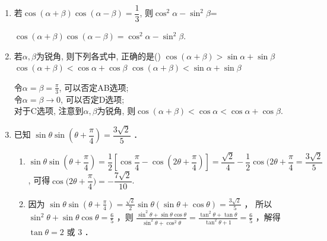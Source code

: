 \begin{enumerate}
\item 若$\cos(\alpha+\beta)\cos(\alpha-\beta)=\dfrac{1}{3}$, 则$\cos^2\alpha-\sin^2\beta$=
\begin{jieda}
$\cos(\alpha+\beta)\cos(\alpha-\beta)=\cos^2\alpha-\sin^2\beta$. 
\end{jieda}

\item 若$\alpha,\beta$为锐角, 则下列各式中, 正确的是\dotfill()
\xx{$\cos(\alpha+\beta)>\cos\alpha+\cos\beta$}
{$\cos(\alpha+\beta)>\sin\alpha+\sin\beta$}
{$\cos(\alpha+\beta)<\cos\alpha+\cos\beta$}
{$\cos(\alpha+\beta)<\sin\alpha+\sin\beta$}
\begin{jieda}
令$\alpha=\beta=\frac{\pi}{3}$, 可以否定AB选项; \\
令$\alpha=\beta\to0$, 可以否定D选项; \\
对于C选项, 注意到$\alpha,\beta$为锐角, 则$\cos(\alpha+\beta)<\cos\alpha<\cos\alpha+\cos\beta$. 
\end{jieda}


\item 已知 $\sin \theta \sin \left(\theta+\dfrac{\pi}{4}\right)=\dfrac{3 \sqrt{2}}{5}$ ．


\begin{jieda}
    \begin{enumerate}
        \item $\sin{\theta}\sin{(\theta+\dfrac{\pi}{4})}=\dfrac{1}{2}[\cos{\dfrac{\pi}{4}}-\cos{(2\theta+\dfrac{\pi}{4})}]=\dfrac{\sqrt{2}}{4}-\dfrac{1}{2}\cos{(2\theta+\dfrac{\pi}{4}}=\dfrac{3\sqrt{2}}{5}$, 可得$\cos{(2\theta+\dfrac{\pi}{4}})=-\dfrac{7\sqrt{2}}{10}$.
        \item 因为 $\sin \theta \sin \left(\theta+\frac{\pi}{4}\right)=\frac{\sqrt{2}}{2} \sin \theta(\sin \theta+\cos \theta)=\frac{3 \sqrt{2}}{5}$ ，
        所以 $\sin ^2 \theta+\sin \theta \cos \theta=\frac{6}{5}$ ，则 $\frac{\sin ^2 \theta+\sin \theta \cos \theta}{\sin ^2 \theta+\cos ^2 \theta}=\frac{\tan ^2 \theta+\tan \theta}{\tan ^2 \theta+1}=\frac{6}{5}$ ，解得 $\tan \theta=2$ 或 3 ．
    \end{enumerate}
\end{jieda}



\end{enumerate}
